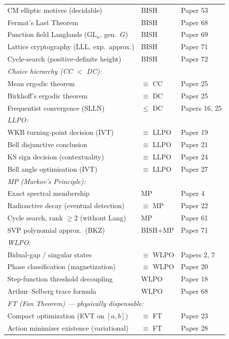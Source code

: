 \documentclass[11pt,a4paper]{article}
\begin{document}
\begin{center}
\begin{longtable}{@{}p{5.8cm}ll@{}}
CM elliptic motives (decidable) & BISH & Paper 53 \\
Fermat's Last Theorem & BISH & Paper 68 \\
Function field Langlands ($\mathrm{GL}_n$, gen.\ $G$) & BISH & Paper 69 \\
Lattice cryptography (LLL, exp.\ approx.) & BISH & Paper 71 \\
Cycle-search (positive-definite height) & BISH & Paper 72 \\
\midrule
\multicolumn{3}{l}{\textit{Choice hierarchy (CC $<$ DC):}} \\
Mean ergodic theorem & $\equiv$ CC & Paper 25 \\
Birkhoff's ergodic theorem & $\equiv$ DC & Paper 25 \\
Frequentist convergence (SLLN) & $\leq$ DC & Papers 16, 25 \\
\midrule
\multicolumn{3}{l}{\textit{LLPO:}} \\
WKB turning-point decision (IVT) & $\equiv$ LLPO & Paper 19 \\
Bell disjunctive conclusion & $\equiv$ LLPO & Paper 21 \\
KS sign decision (contextuality) & $\equiv$ LLPO & Paper 24 \\
Bell angle optimisation (IVT) & $\equiv$ LLPO & Paper 27 \\
\midrule
\multicolumn{3}{l}{\textit{MP (Markov's Principle):}} \\
Exact spectral membership & MP & Paper 4 \\
Radioactive decay (eventual detection) & $\equiv$ MP & Paper 22 \\
Cycle search, rank $\geq 2$ (without Lang) & MP & Paper 61 \\
SVP polynomial approx.\ (BKZ) & BISH+MP & Paper 71 \\
\midrule
\multicolumn{3}{l}{\textit{WLPO:}} \\
Bidual-gap / singular states & $\equiv$ WLPO & Papers 2, 7 \\
Phase classification (magnetization) & $\equiv$ WLPO & Paper 20 \\
Step-function threshold decoupling & WLPO & Paper 18 \\
Arthur--Selberg trace formula & WLPO & Paper 68 \\
\midrule
\multicolumn{3}{l}{\textit{FT (Fan Theorem) --- physically dispensable:}} \\
Compact optimization (EVT on $[a,b]$) & $\equiv$ FT & Paper 23 \\
Action minimizer existence (variational) & $\equiv$ FT & Paper 28 \\

\end{longtable}
\end{center}
\end{document}
